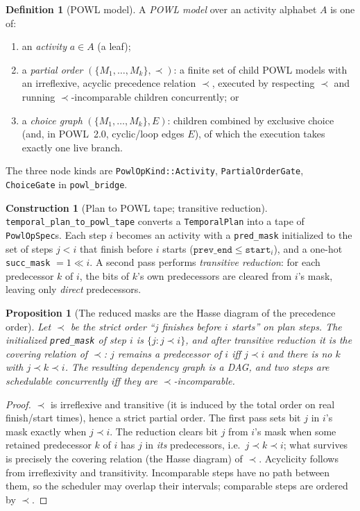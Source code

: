 \documentclass[11pt,oneside]{book}
\theoremstyle{definition}
\newtheorem{definition}{Definition}[chapter]
\newtheorem{construction}{Construction}[chapter]
\theoremstyle{plain}
\newtheorem{proposition}[theorem]{Proposition}
\theoremstyle{remark}
\newcommand{\code}[1]{\texttt{#1}}
\begin{document}
\begin{definition}[POWL model]\label{def:powl}
A \emph{POWL model} over an activity alphabet $A$ is one of:
\begin{enumerate}[label=(\roman*),leftmargin=*]
\item an \emph{activity} $a\in A$ (a leaf);
\item a \emph{partial order} $(\{M_1,\dots,M_k\},\prec)$: a finite set of child POWL models
      with an irreflexive, acyclic precedence relation $\prec$, executed by respecting $\prec$
      and running $\prec$-incomparable children concurrently; or
\item a \emph{choice graph} $(\{M_1,\dots,M_k\},E)$: children combined by exclusive choice
      (and, in POWL~2.0, cyclic/loop edges $E$), of which the execution takes exactly one live
      branch.
\end{enumerate}
The three node kinds are \code{PowlOpKind::Activity}, \code{PartialOrderGate},
\code{ChoiceGate} in \code{powl\_bridge}.
\end{definition}

\begin{construction}[Plan to POWL tape; transitive reduction]\label{con:tape}
\code{temporal\_plan\_to\_powl\_tape} converts a \code{TemporalPlan} into a tape of
\code{PowlOpSpec}s. Each step $i$ becomes an activity with a \code{pred\_mask} initialized to
the set of steps $j<i$ that finish before $i$ starts
($\code{prev\_end}\le\code{start}_i$), and a one-hot \code{succ\_mask} $=1\!\ll\! i$. A second
pass performs \emph{transitive reduction}: for each predecessor $k$ of $i$, the bits of $k$'s
own predecessors are cleared from $i$'s mask, leaving only \emph{direct} predecessors.
\end{construction}

\begin{proposition}[The reduced masks are the Hasse diagram of the precedence order]\label{prop:hasse}
Let $\prec$ be the strict order ``$j$ finishes before $i$ starts'' on plan steps. The
initialized \code{pred\_mask} of step $i$ is $\{j:j\prec i\}$, and after transitive reduction it
is the covering relation of $\prec$: $j$ remains a predecessor of $i$ iff $j\prec i$ and there
is no $k$ with $j\prec k\prec i$. The resulting dependency graph is a DAG, and two steps are
schedulable concurrently iff they are $\prec$-incomparable.
\end{proposition}

\begin{proof}
$\prec$ is irreflexive and transitive (it is induced by the total order on real finish/start
times), hence a strict partial order. The first pass sets bit $j$ in $i$'s mask exactly when
$j\prec i$. The reduction clears bit $j$ from $i$'s mask when some retained predecessor $k$ of
$i$ has $j$ in \emph{its} predecessors, i.e.\ $j\prec k\prec i$; what survives is precisely the
covering relation (the Hasse diagram) of $\prec$. Acyclicity follows from irreflexivity and
transitivity. Incomparable steps have no path between them, so the scheduler may overlap their
intervals; comparable steps are ordered by $\prec$. \end{proof}
\end{document}
